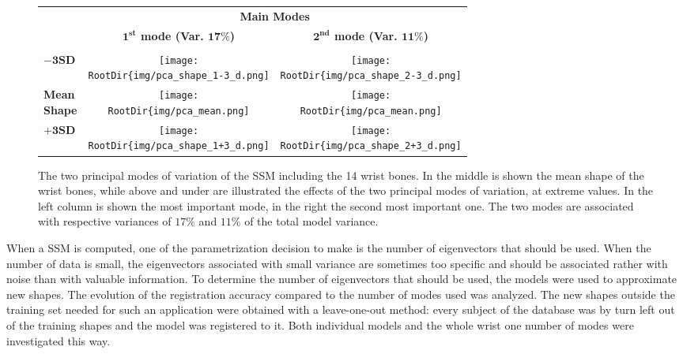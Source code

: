 \begin{figure}[] 
	\centering
	\begin{adjustwidth}{-.2in}{-.2in}  
		\setlength{\extrarowheight}{1em}
		\begin{tabular}{l c c }
			& \multicolumn{2}{c}{\textbf{Main Modes} } \\
			& \textbf{$\mathbf{1^{st}}$ mode (Var. $\mathbf{17\%}$)}  & \textbf{$\mathbf{2^{nd}}$ mode (Var. $\mathbf{11\%}$)}  
			\\
			
			& & \\
			
			
			\textbf{$\mathbf{-3 SD}$}
			& \texttt{[image: \\RootDir\{img/pca\_shape\_1-3\_d.png]}}
			& \texttt{[image: \\RootDir\{img/pca\_shape\_2-3\_d.png]}}
			\\ 
			
			\specialcell[c]{\textbf{Mean}\\\textbf{Shape}}
			& \texttt{[image: \\RootDir\{img/pca\_mean.png]}}
			& \texttt{[image: \\RootDir\{img/pca\_mean.png]}} 
			\\ 
			
			\textbf{$\mathbf{+3 SD}$}
			& \texttt{[image: \\RootDir\{img/pca\_shape\_1+3\_d.png]}}
			& \texttt{[image: \\RootDir\{img/pca\_shape\_2+3\_d.png]}}
			\\
			
		\end{tabular}
		\caption[PCA results on the whole wrist]{The two principal modes of variation of the SSM including the 14 wrist bones. In the middle is shown the mean shape of the wrist bones, while above and under are illustrated the effects of the two principal modes of variation, at extreme values. In the left column is shown the most important mode, in the right the second most important one. The two modes are associated with respective variances of $17\%$ and $11\%$ of the total model variance. }
		\label{im:4_pca_whole_wrist}
	\end{adjustwidth}
	
\end{figure}


When a SSM is computed, one of the parametrization decision to make is the number of eigenvectors that should be used. When the number of data is small, the eigenvectors associated with small variance are sometimes too specific and should be associated rather with noise than with valuable information. To determine the number of eigenvectors that should be used, the models were used to approximate new shapes. The evolution of the registration accuracy compared to the number of modes used was analyzed. The new shapes outside the training set needed for such an application were obtained with a leave-one-out method: every subject of the database was by turn left out of the training shapes and the model was registered to it. Both individual models and the whole wrist one number of modes were investigated this way. 

